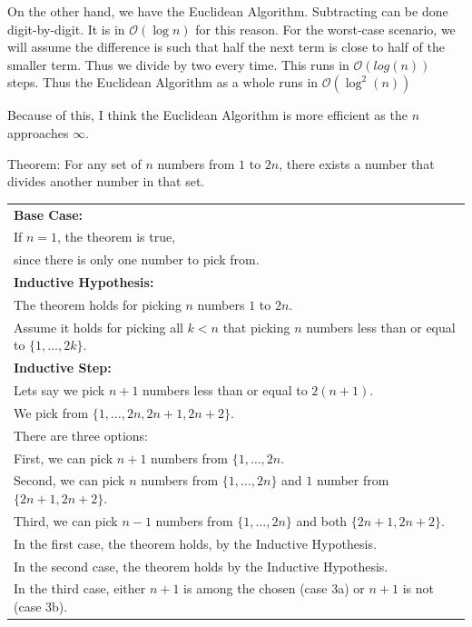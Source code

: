 On the other hand, we have the Euclidean Algorithm. Subtracting can be done digit-by-digit. It is in \(\mathcal{O}(\log n)\) for this reason. For the worst-case scenario, we will assume the difference is such that half the next term is close to half of the smaller term. Thus we divide by two every time. This runs in \(\mathcal{O}(log(n))\) steps. Thus the Euclidean Algorithm as a whole runs in \(\mathcal{O}(\log^2 (n))\)

Because of this, I think the Euclidean Algorithm is more efficient as the $n$ approaches $\infty$.

\item Theorem: For any set of \(n\) numbers from \(1\) to \(2n\), there exists a number that divides another number in that set.

{
\small
\begin{tabular}[t]{l}
\textbf{Base Case:} \\
If \(n = 1\), the theorem is true, \\
since there is only one number to pick from.  \\
\textbf{Inductive Hypothesis:} \\
The theorem holds for picking \(n\) numbers \(1\) to \(2n\). \\
Assume it holds for picking all \(k < n\) that picking \(n\) numbers less than or equal to \(\{1, \dots, 2k\}\). \\
\textbf{Inductive Step:} \\
Lets say we pick \(n + 1\) numbers less than or equal to \(2(n + 1)\). \\
We pick from \(\{1, \dots, 2n, 2n + 1, 2n + 2\}\). \\
There are three options: \\
First, we can pick \(n + 1\) numbers from \(\{1, \dots, 2n\). \\
Second, we can pick \(n\) numbers from \(\{1, \dots, 2n\}\) and \(1\) number from \(\{2n+1, 2n+2\}\). \\
Third, we can pick \(n - 1\) numbers from \(\{1, \dots, 2n\}\) and both \(\{2n + 1, 2n + 2\}\). \\
In the first case, the theorem holds, by the Inductive Hypothesis. \\
In the second case, the theorem holds by the Inductive Hypothesis. \\
In the third case, either \(n+1\) is among the chosen (case 3a) or \(n+1\) is not (case 3b). \\

\end{tabular}}
